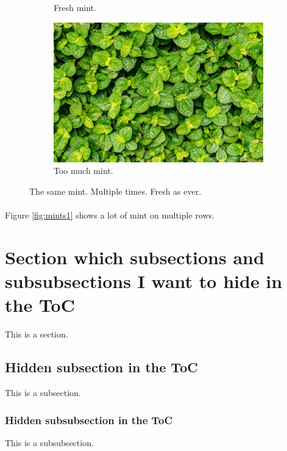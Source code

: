 \documentclass{book}
\begin{document}
\begin{figure}[ht!]
\begin{subfigure}[b]{0.2\linewidth}
    \caption{Fresh mint.}
  \end{subfigure}
  \begin{subfigure}[b]{0.5\linewidth}
    \includegraphics[width=\linewidth]{mint.jpg}
    \caption{Too much mint.}
  \end{subfigure}
  \caption{The same mint. Multiple times. Fresh as ever.}
  \label{fig:mints2}
\end{figure}

\paragraph{} 

Figure \ref{fig:mints1} shows a lot of mint on multiple rows.

\section{Section which subsections and subsubsections I want to hide in the ToC}

This is a section.

\subsection{Hidden subsection in the ToC}

This is a subsection.

\subsubsection{Hidden subsubsection in the ToC}

This is a subsubsection.
\end{document}
